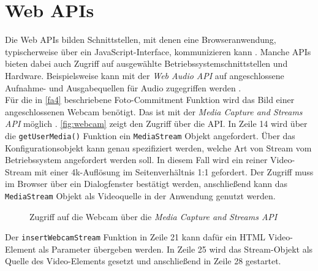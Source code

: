 \section{Web APIs}
\label{sec:web-apis}

Die Web APIs bilden Schnittstellen, mit denen eine Browseranwendung, typischerweise über ein JavaScript-Interface,
kommunizieren kann \cite{web-apis}. Manche APIs bieten dabei auch Zugriff auf ausgewählte 
Betriebssystemschnittstellen und Hardware. Beispielsweise kann mit der \emph{Web Audio API} auf 
angeschlossene Aufnahme- und Ausgabequellen für Audio zugegriffen werden \cite{web-audio-api}.\\
Für die in \ref{fa4} beschriebene
Foto-Commitment Funktion wird das Bild einer angeschlossenen Webcam benötigt. Das ist mit der \emph{Media Capture and 
Streams API} möglich \cite{media-stream}. \autoref{fig:webcam} zeigt den Zugriff über die API. In Zeile 14 wird 
über die \texttt{getUserMedia()} Funktion ein \texttt{MediaStream} Objekt angefordert. Über das Konfigurationsobjekt
kann genau spezifiziert werden, welche Art von Stream vom Betriebssystem angefordert werden soll. In diesem Fall
wird ein reiner Video-Stream mit einer 4k-Auflösung im Seitenverhältnis 1:1 gefordert. Der Zugriff muss 
im Browser über ein Dialogfenster bestätigt werden, anschließend kann das \texttt{MediaStream} Objekt als
Videoquelle in der Anwendung genutzt werden. 

\begin{figure}
  
  \caption{Zugriff auf die Webcam über die \emph{Media Capture and Streams API}}
  \label{fig:webcam}
\end{figure}

Der \texttt{insertWebcamStream} Funktion in Zeile 21 kann dafür
ein HTML Video-Element als Parameter übergeben werden. In Zeile 25 wird das Stream-Objekt als Quelle
des Video-Elements gesetzt und anschließend in Zeile 28 gestartet.
